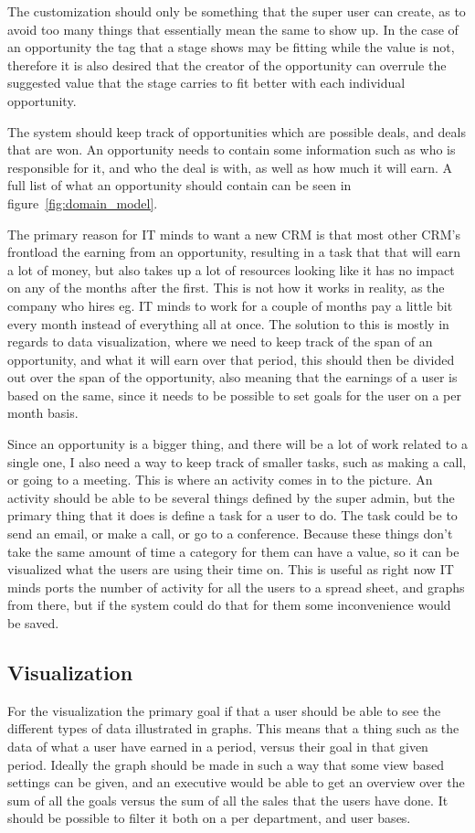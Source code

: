 The customization should only be something that the super user can create, as to avoid too many things that essentially mean the same to show up. In the case of an opportunity the tag that a stage shows may be fitting while the value is not, therefore it is also desired that the creator of the opportunity can overrule the suggested value that the stage carries to fit better with each individual opportunity.

The system should keep track of opportunities which are possible deals, and
deals that are won. An opportunity needs to contain some information such as who
is responsible for it, and who the deal is with, as well as how much it will
earn. A full list of what an opportunity should contain can be seen in
figure~\ref{fig:domain_model}.

The primary reason for IT minds to want a new CRM is that most other CRM's frontload the earning from an opportunity, resulting in a task that that will earn a lot of money, but also takes up a lot of resources looking like it has no impact on any of the months after the first. This is not how it works in reality, as the company who hires eg. IT minds to work for a couple of months pay a little bit every month instead of everything all at once. The solution to this is mostly in regards to data visualization, where we need to keep track of the span of an opportunity, and what it will earn over that period, this should then be divided out over the span of the opportunity, also meaning that the earnings of a user is based on the same, since it needs to be possible to set goals for the user on a per month basis.

Since an opportunity is a bigger thing, and there will be a lot of work related to a single one, I also need a way to keep track of smaller tasks, such as making a call, or going to a meeting. This is where an activity comes in to the picture. An activity should be able to be several things defined by the super admin, but the primary thing that it does is define a task for a user to do. The task could be to send an email, or make a call, or go to a conference. Because these things don't take the same amount of time a category for them can have a value, so it can be visualized what the users are using their time on. This is useful as right now IT minds ports the number of activity for all the users to a spread sheet, and graphs from there, but if the system could do that for them some inconvenience would be saved.

\subsection{Visualization}
\label{sub:Visualization}
For the visualization the primary goal if that a user should be able to see the different types of data illustrated in graphs. This means that a thing such as the data of what a user have earned in a period, versus their goal in that given period. Ideally the graph should be made in such a way that some view based settings can be given, and an executive would be able to get an overview over the sum of all the goals versus the sum of all the sales that the users have done. It should be possible to filter it both on a per department, and user bases.

